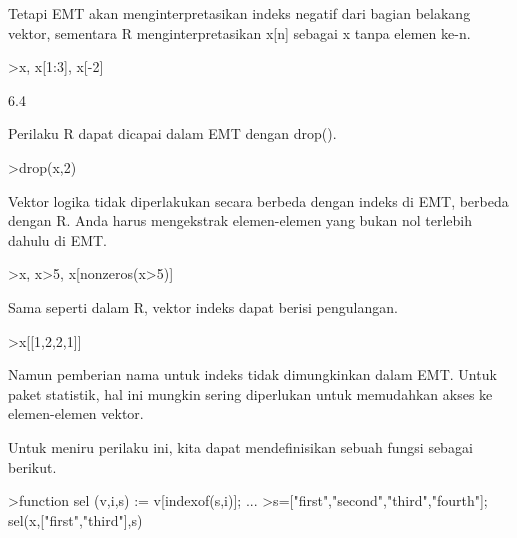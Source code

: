 \documentclass[a4paper,10pt]{article}
\begin{document}
\begin{eulernotebook}
\begin{eulercomment}
\begin{eulercomment}
\begin{eulercomment}
\begin{eulercomment}
\begin{eulercomment}
Tetapi EMT akan menginterpretasikan indeks negatif dari bagian
belakang vektor, sementara R menginterpretasikan x[n] sebagai x tanpa
elemen ke-n.
\end{eulercomment}
\begin{eulerprompt}
>x, x[1:3], x[-2]
\end{eulerprompt}
\begin{euleroutput}
  [10.4,  5.6,  3.1,  6.4,  21.7]
  [10.4,  5.6,  3.1]
  6.4
\end{euleroutput}
\begin{eulercomment}
Perilaku R dapat dicapai dalam EMT dengan drop().
\end{eulercomment}
\begin{eulerprompt}
>drop(x,2)
\end{eulerprompt}
\begin{euleroutput}
  [10.4,  3.1,  6.4,  21.7]
\end{euleroutput}
\begin{eulercomment}
Vektor logika tidak diperlakukan secara berbeda dengan indeks di EMT,
berbeda dengan R. Anda harus mengekstrak elemen-elemen yang bukan nol
terlebih dahulu di EMT.
\end{eulercomment}
\begin{eulerprompt}
>x, x>5, x[nonzeros(x>5)]
\end{eulerprompt}
\begin{euleroutput}
  [10.4,  5.6,  3.1,  6.4,  21.7]
  [1,  1,  0,  1,  1]
  [10.4,  5.6,  6.4,  21.7]
\end{euleroutput}
\begin{eulercomment}
Sama seperti dalam R, vektor indeks dapat berisi pengulangan.
\end{eulercomment}
\begin{eulerprompt}
>x[[1,2,2,1]]
\end{eulerprompt}
\begin{euleroutput}
  [10.4,  5.6,  5.6,  10.4]
\end{euleroutput}
\begin{eulercomment}
Namun pemberian nama untuk indeks tidak dimungkinkan dalam EMT. Untuk
paket statistik, hal ini mungkin sering diperlukan untuk memudahkan
akses ke elemen-elemen vektor.

Untuk meniru perilaku ini, kita dapat mendefinisikan sebuah fungsi
sebagai berikut.
\end{eulercomment}
\begin{eulerprompt}
>function sel (v,i,s) := v[indexof(s,i)]; ...
>s=["first","second","third","fourth"]; sel(x,["first","third"],s)
\end{eulerprompt}
\begin{euleroutput}
  

\end{euleroutput}
\end{eulercomment}
\end{eulercomment}
\end{eulercomment}
\end{eulercomment}
\end{eulernotebook}
\end{document}
